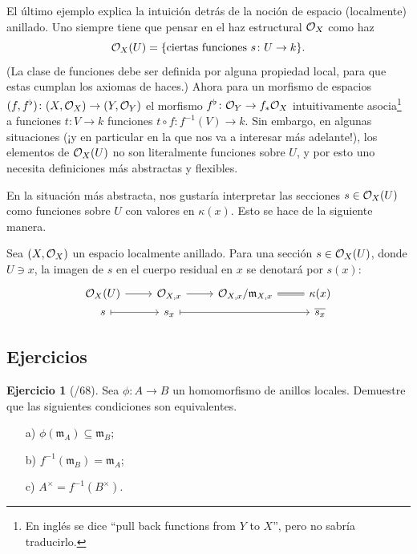 \documentclass{article}
\numberwithin{equation}{section}
\newcounter{ejerctot}
\newcommand{\ejerccount}{\stepcounter{ejerctot}\theejerctot/68}
\theoremstyle{definition}
\newtheorem{ejerc}{Ejercicio}[section]
\begin{document}
El último ejemplo explica la intuición detrás de la noción de espacio
(localmente) anillado. Uno siempre tiene que pensar en el haz estructural $\mathcal{O}_X$
como haz
$$\mathcal{O}_X (U) = \{ \text{ciertas funciones }s\colon U \to k \}.$$
(La clase de funciones debe ser definida por alguna propiedad local, para que
estas cumplan los axiomas de haces.) Ahora para un morfismo de espacios
$(f,f^\flat)\colon (X, \mathcal{O}_X) \to (Y, \mathcal{O}_Y)$ el morfismo
$f^\flat\colon \mathcal{O}_Y \to f_* \mathcal{O}_X$ intuitivamente asocia\footnote{En inglés se
  dice ``pull back functions from $Y$ to $X$'', pero no sabría traducirlo.}
a funciones $t\colon V\to k$ funciones $t\circ f\colon f^{-1} (V)\to k$.
Sin embargo, en algunas situaciones (¡y en particular en la que nos va a
interesar más adelante!), los elementos de $\mathcal{O}_X (U)$ no son literalmente
funciones sobre $U$, y por esto uno necesita definiciones más abstractas y
flexibles.

\vspace{1em}

En la situación más abstracta, nos gustaría interpretar las secciones
$s \in \mathcal{O}_X (U)$ como funciones sobre $U$ con valores en $\kappa (x)$.
Esto se hace de la siguiente manera.

\begin{definicion}
  \label{dfn:evaluacion-de-funciones}
  Sea $(X,\mathcal{O}_X)$ un espacio localmente anillado. Para una sección
  $s \in \mathcal{O}_X (U)$, donde $U \ni x$, la imagen de $s$ en el cuerpo residual en
  $x$ se denotará por $s (x)$:
  \[ \begin{tikzcd}[row sep=0pt]
      \O_X (U) \ar{r} & \O_{X,x} \ar{r} & \O_{X,x}/\mathfrak{m}_{X,x} \ar[equals]{r} & \kappa (x) \\
      s \ar[|->]{r} & s_x \ar[|->]{rr} & & \overline{s_x}
    \end{tikzcd} \]
\end{definicion}

\pagebreak

\subsection{Ejercicios}

\begin{ejerc}[\ejerccount]
  Sea $\phi\colon A\to B$ un homomorfismo de anillos locales. Demuestre que
  las siguientes condiciones son equivalentes.
  \begin{enumerate}
  \item[a)] $\phi (\mathfrak{m}_A) \subseteq \mathfrak{m}_B$;
  \item[b)] $f^{-1} (\mathfrak{m}_B) = \mathfrak{m}_A$;
  \item[c)] $A^\times = f^{-1} (B^\times)$.
  \end{enumerate}
\end{ejerc}
\end{document}

